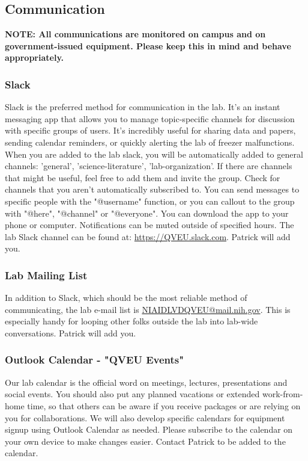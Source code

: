 \documentclass[10pt, letterpaper, twocolumn]{article} %
\begin{document}
\subsection{Communication}
{\bfseries NOTE: All communications are monitored on campus and on government-issued equipment. Please keep this in mind and behave appropriately.}
\subsubsection{Slack}
Slack is the preferred method for communication in the lab. It's an instant messaging app that allows you to manage topic-specific channels for discussion with specific groups of users. It’s incredibly useful for sharing data and papers, sending calendar reminders, or quickly alerting the lab of freezer malfunctions. When you are added to the lab slack, you will be automatically added to general channels: 'general', 'science-literature', 'lab-organization'. If there are channels that might be useful, feel free to add them and invite the group. Check for channels that you aren't automatically subscribed to. You can send messages to specific people with the "@username" function, or you can callout to the group with "@here", "@channel" or "@everyone". You can download the app to your phone or computer. Notifications can be muted outside of specified hours. The lab Slack channel can be found at: \href{https://QVEU.slack.com}{https://QVEU.slack.com}. Patrick will add you.\newline

\subsubsection{Lab Mailing List}
In addition to Slack, which should be the most reliable method of communicating, the lab e-mail list is \href{mailto:NIAIDLVDQVEU@mail.nih.gov}{NIAIDLVDQVEU@mail.nih.gov}. This is especially handy for looping other folks outside the lab into lab-wide conversations. Patrick will add you.

\subsubsection{Outlook Calendar - "QVEU Events"}
Our lab calendar is the official word on meetings, lectures, presentations and social events. You should also put any planned vacations or extended work-from-home time, so that others can be aware if you receive packages or are relying on you for collaborations. We will also develop specific calendars for equipment signup using Outlook Calendar as needed. Please subscribe to the calendar on your own device to make changes easier. Contact Patrick to be added to the calendar.
\end{document}
